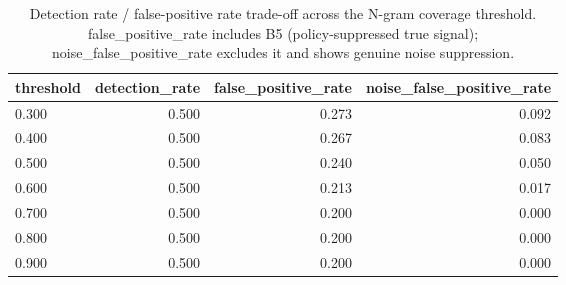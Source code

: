 \begin{table}[t]
\centering
\caption{Detection rate / false-positive rate trade-off across the N-gram coverage threshold. false\_positive\_rate includes B5 (policy-suppressed true signal); noise\_false\_positive\_rate excludes it and shows genuine noise suppression.}
\label{tab:threshold_sweep}
\begin{tabular}{lrrr}
\toprule
threshold & detection\_rate & false\_positive\_rate & noise\_false\_positive\_rate \\
\midrule
0.300 & 0.500 & 0.273 & 0.092 \\
0.400 & 0.500 & 0.267 & 0.083 \\
0.500 & 0.500 & 0.240 & 0.050 \\
0.600 & 0.500 & 0.213 & 0.017 \\
0.700 & 0.500 & 0.200 & 0.000 \\
0.800 & 0.500 & 0.200 & 0.000 \\
0.900 & 0.500 & 0.200 & 0.000 \\
\bottomrule
\end{tabular}
\end{table}
